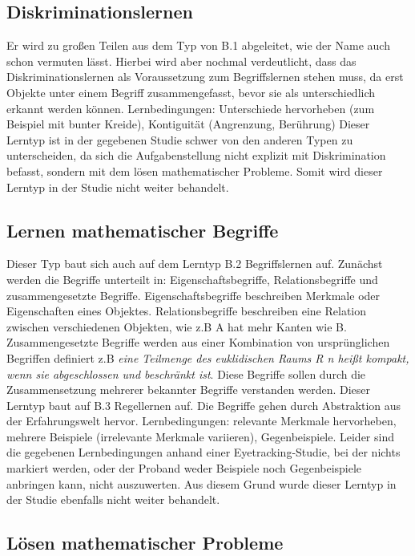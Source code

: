 \subsection[]{Diskriminationslernen}

Er wird zu großen Teilen aus dem Typ von B.1 abgeleitet, wie der Name auch schon vermuten lässt. Hierbei wird aber nochmal verdeutlicht, dass das Diskriminationslernen als Voraussetzung zum Begriffslernen stehen muss, da erst Objekte unter einem Begriff zusammengefasst, bevor sie als unterschiedlich erkannt werden können.
Lernbedingungen: Unterschiede hervorheben (zum Beispiel mit bunter Kreide), Kontiguität (Angrenzung, Berührung)%
Dieser Lerntyp ist in der gegebenen Studie schwer von den anderen Typen zu unterscheiden, da sich die Aufgabenstellung nicht explizit mit Diskrimination befasst, sondern mit dem lösen mathematischer Probleme. Somit wird dieser Lerntyp in der Studie nicht weiter behandelt.

\subsection[]{Lernen mathematischer Begriffe}

Dieser Typ baut sich auch auf dem Lerntyp B.2 Begriffslernen auf. Zunächst werden die Begriffe unterteilt in: Eigenschaftsbegriffe, Relationsbegriffe und zusammengesetzte Begriffe. Eigenschaftsbegriffe beschreiben Merkmale oder Eigenschaften eines Objektes. Relationsbegriffe beschreiben eine Relation zwischen verschiedenen Objekten, wie z.B A hat mehr Kanten wie B. Zusammengesetzte Begriffe werden aus einer Kombination von ursprünglichen Begriffen definiert z.B \textit {eine Teilmenge des euklidischen Raums R n heißt kompakt, wenn sie abgeschlossen und beschränkt ist}. Diese Begriffe sollen durch die Zusammensetzung mehrerer bekannter Begriffe verstanden werden. Dieser Lerntyp baut auf B.3 Regellernen auf. Die Begriffe gehen durch Abstraktion aus der Erfahrungswelt hervor.
Lernbedingungen: relevante Merkmale hervorheben, mehrere Beispiele (irrelevante Merkmale variieren), Gegenbeispiele.
Leider sind die gegebenen Lernbedingungen anhand einer Eyetracking-Studie, bei der nichts markiert werden, oder der Proband weder Beispiele noch Gegenbeispiele anbringen kann, nicht auszuwerten. Aus diesem Grund wurde dieser Lerntyp in der Studie ebenfalls nicht weiter behandelt. 

\subsection[]{Lösen mathematischer Probleme}

